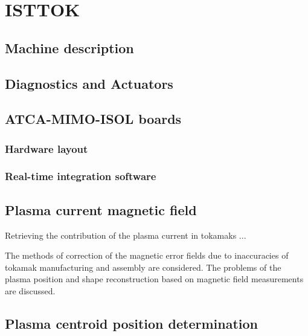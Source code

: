 \chapter{ISTTOK }

\section{Machine description}
\section{Diagnostics and Actuators}
\section{ATCA-MIMO-ISOL boards}
\subsection{Hardware layout}
\subsection{Real-time  integration software}
\section{Plasma current magnetic field }

Retrieving the contribution of the plasma current in tokamaks ...

The methods of correction of the magnetic error fields due to inaccuracies
of tokamak manufacturing and assembly are considered. The problems of the
plasma position and shape reconstruction based on magnetic field measurements are discussed.

\section{Plasma centroid position determination}